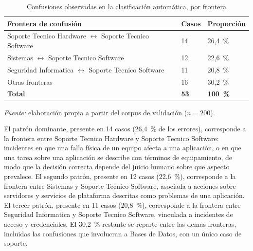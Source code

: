 \begin{table}[htbp]
\centering
\caption{Confusiones observadas en la clasificación automática, por frontera}
\label{tab:errores}
\small
\begin{tabular}{@{}>{\raggedright\arraybackslash}p{8.5cm} p{2.0cm} p{2.5cm}@{}}
\toprule
\textbf{Frontera de confusión} & \textbf{Casos} & \textbf{Proporción} \\
\midrule
Soporte Tecnico Hardware \(\leftrightarrow\) Soporte Tecnico Software & 14 & 26,4~\% \\
Sistemas \(\leftrightarrow\) Soporte Tecnico Software & 12 & 22,6~\% \\
Seguridad Informatica \(\leftrightarrow\) Soporte Tecnico Software & 11 & 20,8~\% \\
Otras fronteras & 16 & 30,2~\% \\
\midrule
\textbf{Total} & \textbf{53} & \textbf{100~\%} \\
\bottomrule
\end{tabular}
\par\smallskip
{\footnotesize\textit{Fuente:} elaboración propia a partir del corpus de validación (\(n = 200\)).\par}
\end{table}

El patrón dominante, presente en 14 casos (26,4~\% de los errores), corresponde a la frontera entre Soporte Tecnico Hardware y Soporte Tecnico Software: incidentes en que una falla física de un equipo afecta a una aplicación, o en que una tarea sobre una aplicación se describe con términos de equipamiento, de modo que la decisión correcta depende del juicio humano sobre que aspecto prevalece. El segundo patrón, presente en 12 casos (22,6~\%), corresponde a la frontera entre Sistemas y Soporte Tecnico Software, asociada a acciones sobre servidores y servicios de plataforma descritas como problemas de una aplicación. El tercer patrón, presente en 11 casos (20,8~\%), corresponde a la frontera entre Seguridad Informatica y Soporte Tecnico Software, vinculada a incidentes de acceso y credenciales. El 30,2~\% restante se reparte entre las demas fronteras, incluidas las confusiones que involucran a Bases de Datos, con un único caso de soporte.

